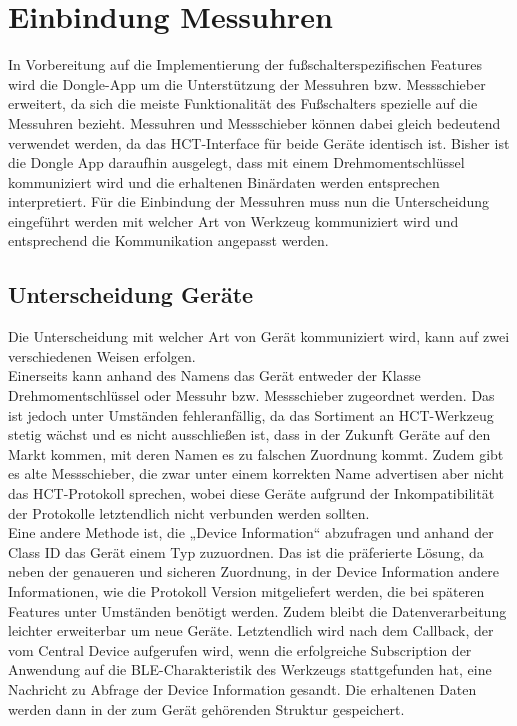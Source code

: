 \section{Einbindung Messuhren}
In Vorbereitung auf die Implementierung der fußschalterspezifischen Features wird die Dongle-App um die Unterstützung der Messuhren bzw. Messschieber erweitert, da sich die meiste Funktionalität des Fußschalters spezielle auf die Messuhren bezieht. Messuhren und Messschieber können dabei gleich bedeutend verwendet werden, da das HCT-Interface für beide Geräte identisch ist. Bisher ist die Dongle App daraufhin ausgelegt, dass mit einem Drehmomentschlüssel kommuniziert wird und die erhaltenen Binärdaten werden entsprechen interpretiert. Für die Einbindung der Messuhren muss nun die Unterscheidung eingeführt werden mit welcher Art von Werkzeug kommuniziert wird und entsprechend die Kommunikation angepasst werden.

\subsection{Unterscheidung Geräte}
Die Unterscheidung mit welcher Art von Gerät kommuniziert wird, kann auf zwei verschiedenen Weisen erfolgen. \\
Einerseits kann anhand des Namens das Gerät entweder der Klasse Drehmomentschlüssel oder Messuhr bzw. Messschieber zugeordnet werden. Das ist jedoch unter Umständen fehleranfällig, da das Sortiment an HCT-Werkzeug stetig wächst und es nicht ausschließen ist, dass in der Zukunft Geräte auf den Markt kommen, mit deren Namen es zu falschen Zuordnung kommt. Zudem gibt es alte Messschieber, die zwar unter einem korrekten Name advertisen aber nicht das HCT-Protokoll sprechen, wobei diese Geräte aufgrund der Inkompatibilität der Protokolle letztendlich nicht verbunden werden sollten. \\
Eine andere Methode ist, die „Device Information“ abzufragen und anhand der Class ID das Gerät einem Typ zuzuordnen. Das ist die präferierte Lösung, da neben der genaueren und sicheren Zuordnung, in der Device Information andere Informationen, wie die Protokoll Version mitgeliefert werden, die bei späteren Features unter Umständen benötigt werden. Zudem bleibt die Datenverarbeitung leichter erweiterbar um neue Geräte.
Letztendlich wird nach dem Callback, der vom Central Device aufgerufen wird, wenn die erfolgreiche Subscription der Anwendung auf die BLE-Charakteristik des Werkzeugs stattgefunden hat, eine Nachricht zu Abfrage der Device Information gesandt. Die erhaltenen Daten werden dann in der zum Gerät gehörenden Struktur gespeichert.

